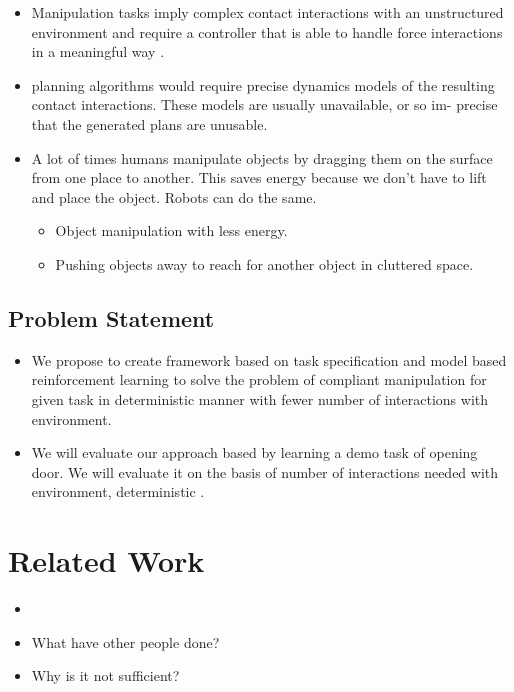 \documentclass[thesis]{mas_proposal}
\begin{document}
\begin{itemize}
    \item Manipulation tasks imply complex contact interactions with an unstructured environment and require a controller that is able to handle force interactions in a meaningful way \cite{kalakrishnan2011learning}.
    \item planning algorithms would require precise dynamics models of the resulting contact interactions. These models are usually unavailable, or so im- precise that the generated plans are unusable\cite{kalakrishnan2011learning}.
    \item A lot of times humans manipulate objects by dragging them on the surface from one place to another. This saves energy because we don't have to lift and place the object. Robots can do the same. 
    \begin{itemize}
    	\item Object manipulation with less energy.
    	\item Pushing objects away to reach for another object in cluttered space.
    \end{itemize}
\end{itemize}

\section{Problem Statement}
\begin{itemize}
    \item We propose to create framework based on task specification and model based reinforcement learning to solve the problem of compliant manipulation for given task in deterministic manner with fewer number of interactions with environment.
    \item We will evaluate our approach based by learning a demo task of opening door. We will evaluate it on the basis of number of interactions needed with environment, deterministic .
\end{itemize}


\chapter{Related Work}
\begin{itemize}
	\item 
    \item What have other people done?
    \item Why is it not sufficient?
\end{itemize}
\end{document}
